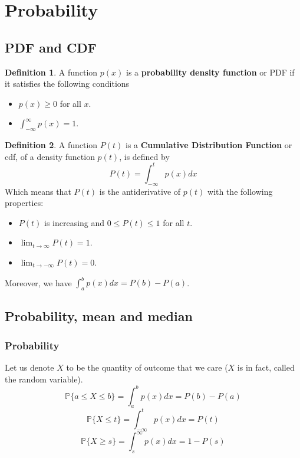 \documentclass[12pt]{article}
\theoremstyle{definition}
\theoremstyle{definition}
\newtheorem{definition}{Definition}[section]
\theoremstyle{remark}
\theoremstyle{definition}
\theoremstyle{definition}
\theoremstyle{definition}
\begin{document}
\section{Probability}
\subsection{PDF and CDF}
\begin{definition}
A function $p(x)$ is a \textbf{probability density function} or PDF if it satisfies the following conditions
\begin{itemize}
\item $p(x) \geq 0$ for all $x$.
\item $\int_{-\infty}^\infty p(x) = 1.$
\end{itemize}
\end{definition}

\begin{definition}
A function $P(t)$ is a \textbf{Cumulative Distribution Function} or cdf, of a density function $p(t)$, is defined by 
\[P(t) =\int_{-\infty}^t p(x) dx \]
Which means that $P(t)$ is the antiderivative of $p(t)$ with the following properties:
\begin{itemize}
\item $P(t)$ is increasing and $0\leq P(t)\leq 1$ for all $t$.
\item $\lim_{t \to \infty}P(t)=1.$
\item $\lim_{t \to -\infty}P(t)=0.$
\end{itemize}
\end{definition}

Moreover, we have $\int_a^b p(x)dx=P(b)-P(a)$.

\subsection{Probability, mean and median}

\subsubsection*{Probability}
Let us denote $X$ to be the quantity of outcome that we care ($X$ is in fact, called the random variable).
\[\mathbb{P}\{a\leq X\leq b\}=\int_a^b p(x)dx=P(b)-P(a)\]
\[\mathbb{P}\{X\leq t\}=\int_{-\infty}^t p(x)dx=P(t)\]
\[\mathbb{P}\{X\geq s\}=\int_{s}^\infty p(x)dx=1-P(s)\]
\end{document}
